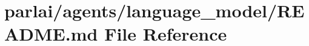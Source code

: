 \hypertarget{parlai_2agents_2language__model_2README_8md}{}\section{parlai/agents/language\+\_\+model/\+R\+E\+A\+D\+ME.md File Reference}
\label{parlai_2agents_2language__model_2README_8md}
